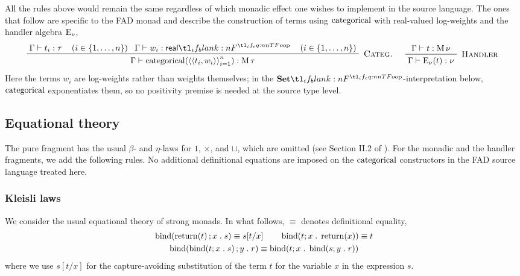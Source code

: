 \documentclass[11pt,a4paper]{article}
\theoremstyle{definition}
\theoremstyle{remark}
\providecommand{\casubst}[3]{#1[#3/#2]}
\begin{document}
All the rules above would remain the same regardless of which monadic effect one wishes to implement in the source language. The ones that follow are specific to the FAD monad and describe the construction of terms using \( \opn[b]{categorical} \) with real-valued log-weights and the handler algebra \( \opn[b]{E}_{\nu} \),
\begin{equation*}
  \prftree[r]{\textsc{ Categ. }}{
    \Gamma \vdash t_{i}: \tau
    \quad
    \left( i \in \left\{ 1, \dots, n \right\} \right)
  }{
    \Gamma \vdash w_{i}: \srcreal
    \quad
    \left( i \in \left\{ 1, \dots, n \right\} \right)
  }{
    \Gamma \vdash
    \fn[n]{ \opn[b]{categorical} }{
      \tuple{
        \tuple{t_{i}, w_{i}}
      }_{i = 1}^{n}
    } :
    \opn[b]{M} \tau
  }
  \quad
  \prftree[r]{\textsc{ Handler }}{
    \Gamma \vdash t : \opn[b]{M} \nu
  }{
    \Gamma \vdash \fn[n]{ \opn[b]{E}_{\nu} }{ t } : \nu
  }
\end{equation*}
Here the terms \( w_i \) are log-weights rather than weights themselves; in the \( \Set \)-interpretation below, \( \opn[b]{categorical} \) exponentiates them, so no positivity premise is needed at the source type level.

\subsection{Equational theory}
\label{sec:appendix-source-language-equational-theory}

The pure fragment has the usual \( \beta \)- and \( \eta \)-laws for \( 1 \), \( \times \), and \( \sqcup \), which are omitted (see Section II.2 of \cite{lambekIntroductionHigherOrder1986}). For the monadic and the handler fragments, we add the following rules. No additional definitional equations are imposed on the \( \opn[b]{categorical} \) constructors in the FAD source language treated here.

\subsubsection{Kleisli laws}

We consider the usual equational theory of strong monads.
In what follows, \( \equiv \) denotes definitional equality,
\begin{equation}
  \label{eq:appendix-source-language-kleisli-laws}
  \begin{gathered}
    \fn[n]{ \opn[b]{bind} }{ \fn[n]{ \opn[b]{return} }{ t }; x \; . \; s }
    \equiv
    \casubst{s}{x}{t}
    \qquad
    \fn[n]{ \opn[b]{bind} }{ t; x \; . \; \fn[n]{ \opn[b]{return} }{ x } }
    \equiv t
    \\
    \fn[n]{ \opn[b]{bind} }{
      \fn[n]{ \opn[b]{bind} }{ t; x \; . \; s };
      y \; . \; r
    }
    \equiv
    \fn[n]{ \opn[b]{bind} }{
      t;
      x \; . \; \fn[n]{ \opn[b]{bind} }{ s ; y \; . \; r }
    }
  \end{gathered}
\end{equation}
where we use \( \casubst{s}{x}{t} \) for the capture-avoiding substitution of the term \( t \) for the variable \( x \) in the expression \( s \).
\end{document}
